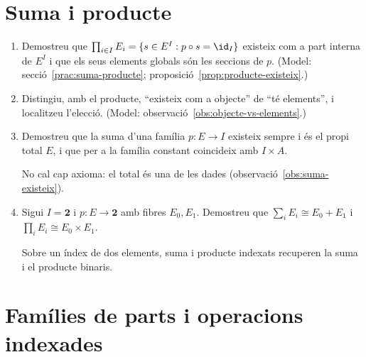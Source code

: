 \section{Suma i producte}

\begin{enumerate}[resume]
  \item Demostreu que \(\prod_{i\in I}E_i=\{s\in E^I:p\circ s=\id_I\}\) existeix com a part interna de \(E^I\) i que els seus elements globals són les seccions de \(p\). (Model: secció~\ref{prac:suma-producte}; proposició~\ref{prop:producte-existeix}.)

  \item Distingiu, amb el producte, \enquote{existeix com a objecte} de \enquote{té elements}, i localitzeu l'elecció. (Model: observació~\ref{obs:objecte-vs-elements}.)

  \item Demostreu que la suma d'una família \(p\colon E\to I\) existeix sempre i és el propi total \(E\), i que per a la família constant coincideix amb \(I\times A\). \begin{indicacio}No cal cap axioma: el total és una de les dades (observació~\ref{obs:suma-existeix}).\end{indicacio}

  \item Sigui \(I=\mathbf2\) i \(p\colon E\to\mathbf2\) amb fibres \(E_0,E_1\). Demostreu que \(\sum_{i}E_i\cong E_0+E_1\) i \(\prod_{i}E_i\cong E_0\times E_1\). \begin{indicacio}Sobre un índex de dos elements, suma i producte indexats recuperen la suma i el producte binaris.\end{indicacio}
\end{enumerate}

\section{Famílies de parts i operacions indexades}

